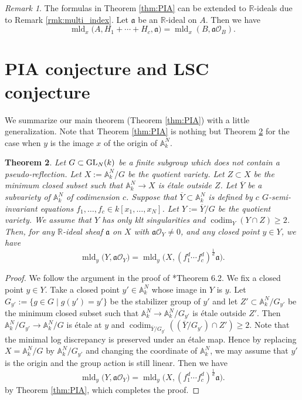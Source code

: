 \documentclass[a4paper,11pt]{amsart}
\newtheorem{thm}{Theorem}[section]
\theoremstyle{definition}
\theoremstyle{remark}
\newtheorem{rmk}[thm]{Remark}
\begin{document}
\begin{rmk}\label{rmk:multi_index2}
The formulas in Theorem \ref{thm:PIA} can be extended to $\mathbb{R}$-ideals due to Remark \ref{rmk:multi_index}. 
Let $\mathfrak{a}$ be an $\mathbb{R}$-ideal on $A$. 
Then we have
\[
\operatorname{mld}_x \bigl(A, H_1 + \cdots + H_c, \mathfrak{a} \bigr)
=\operatorname{mld}_x (B, \mathfrak{a}\mathcal O_{B}). 
\]
\end{rmk}

\section{PIA conjecture and LSC conjecture}\label{section:LSC}
We summarize our main theorem (Theorem \ref{thm:PIA}) with a little generalization. 
Note that Theorem \ref{thm:PIA} is nothing but 
Theorem \ref{thm:PIA2} for the case when $y$ is the image $x$ of the origin of $\mathbb{A}^N _k$. 

\begin{thm}\label{thm:PIA2}
Let $G \subset {\rm GL}_N(k)$ be a finite subgroup which does not contain a pseudo-reflection. 
Let $X := \mathbb{A}_k^N / G$ be the quotient variety. 
Let $Z \subset X$ be the minimum closed subset such that $\mathbb{A}_k^N \to X$ is \'{e}tale outside $Z$. 
Let $\overline{Y}$ be a subvariety of $\mathbb{A}_k^N$ of codimension $c$. 
Suppose that $\overline{Y} \subset \mathbb{A}_k^N$ is defined by $c$ $G$-semi-invariant equations 
$f_1, \ldots , f_c \in k[x_1, \ldots, x_N]$. 
Let $Y := \overline{Y}/ G$ be the quotient variety. 
We assume that $Y$ has only klt singularities and $\operatorname{codim} _Y (Y \cap Z) \ge 2$. 
Then, for any $\mathbb{R}$-ideal sheaf $\mathfrak{a}$ on $X$ with $\mathfrak{a} \mathcal{O}_Y \not = 0$, and any closed point $y \in Y$, we have 
\[
\operatorname{mld}_y \bigl( Y, \mathfrak{a}\mathcal{O}_Y \bigr) = 
\operatorname{mld}_y \bigl( X, (f_1 ^d  \cdots f_{c} ^d )^{\frac{1}{d}} \mathfrak{a} \bigr). 
\]
\end{thm}
\begin{proof}
We follow the argument in the proof of \cite{NS22}*{Theorem 6.2}. 
We fix a closed point $y \in Y$. 
Take a closed point $y' \in \mathbb{A}_k^N$ whose image in $Y$ is $y$. 
Let $G_{y'} := \{ g \in G \mid g(y') = y'\}$ be the stabilizer group of $y'$ and let $Z' \subset \mathbb{A}_k ^N / G_{y'}$ be the minimum closed subset such that $\mathbb{A}_k^N \to \mathbb{A}_k ^N / G_{y'}$ is \'{e}tale outside $Z'$. 
Then $\mathbb{A}_k ^N / G_{y'} \to \mathbb{A}_k ^N / G$ is \'{e}tale at $y$ and $\operatorname{codim} _{\overline{Y}/G_{y'}} \left( \left( \overline{Y}/G_{y'} \right) \cap Z' \right) \ge 2$. 
Note that the minimal log discrepancy is preserved under an \'{e}tale map. 
Hence by replacing $X = \mathbb{A}_k ^N / G$ by $\mathbb{A}_k ^N / G_{y'}$ and changing the coordinate of $\mathbb{A}_k ^N$, 
we may assume that $y'$ is the origin and the group action is still linear. 
Then we have 
\[
\operatorname{mld}_y \bigl( Y, \mathfrak{a}\mathcal{O}_Y \bigr) = 
\operatorname{mld}_y \bigl( X, (f_1^d \cdots f_{c}^d)^{\frac{1}{d}} \mathfrak{a} \bigr). 
\]
by Theorem \ref{thm:PIA}, which completes the proof. 
\end{proof}
\end{document}
